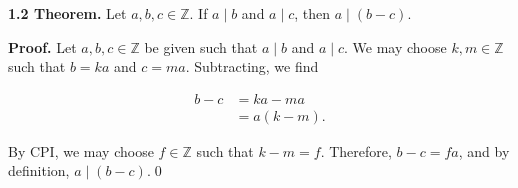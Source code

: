 \documentclass[12pt]{article}
\begin{document}
\noindent\textbf{1.2 Theorem.} Let $a,b,c\in\mathbb{Z}$. If $a\mid b$ and $a\mid c$, then $a\mid (b-c)$.

\bigskip

\noindent\textbf{Proof.} Let $a,b,c\in\mathbb{Z}$ be given such that $a\mid b$ and $a\mid c$. We may choose $k,m\in\mathbb{Z}$ such that $b=ka$ and $c=ma$. Subtracting, we find


\begin{align*}
b-c &= ka- ma \\
&= a(k-m).
\end{align*}


\noindent By CPI, we may choose $f\in\mathbb{Z}$ such that $k-m=f$. Therefore, $b-c=fa$, and by definition, $a\mid(b-c)$.\qed
\end{document}
